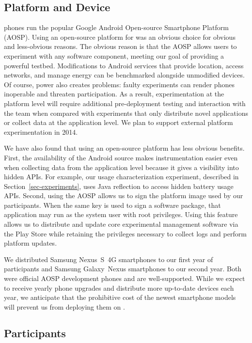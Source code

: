 \subsection{Platform and Device}

\PhoneLab{} phones run the popular Google Android Open-source Smartphone
Platform (AOSP). Using an open-source platform for \PhoneLab{} was an obvious
choice for obvious and less-obvious reasons. The obvious reason is that the
AOSP allows \PhoneLab{} users to experiment with any software component,
meeting our goal of providing a powerful testbed. Modifications to Android
services that provide location, access networks, and manage energy can be
benchmarked alongside unmodified devices. Of course, power also creates
problems: faulty experiments can render phones inoperable and threaten
participation. As a result, experimentation at the platform level will
require additional pre-deployment testing and interaction with the
\PhoneLab{} team when compared with experiments that only distribute novel
applications or collect data at the application level. We plan to
support external platform experimentation in 2014.

We have also found that using an open-source platform has less obvious
benefits. First, the availability of the Android source makes \PhoneLab{}
instrumentation easier even when collecting data from the application level
because it gives a visibility into hidden APIs. For example, our usage
characterization experiment, described in Section~\ref{sec-experiments}, uses
Java reflection to access hidden battery usage APIs. Second, using the AOSP
allows us to sign the platform image used by our participants. When the same
key is used to sign a software package, that application may run as the
system user with root privileges. Using this feature allows us to distribute
and update core \PhoneLab{} experimental management software via the Play
Store while retaining the privileges necessary to collect logs and perform
platform updates.

We distributed Samsung Nexus~S~4G smartphones to our first year of
participants and Samsung Galaxy~Nexus smartphones to our second year. Both
were official AOSP development phones and are well-supported. While we expect to
receive yearly phone upgrades and distribute more up-to-date devices each year,
we anticipate that the prohibitive cost of the newest smartphone models will
prevent us from deploying them on \PhoneLab{}.

\subsection{Participants}

